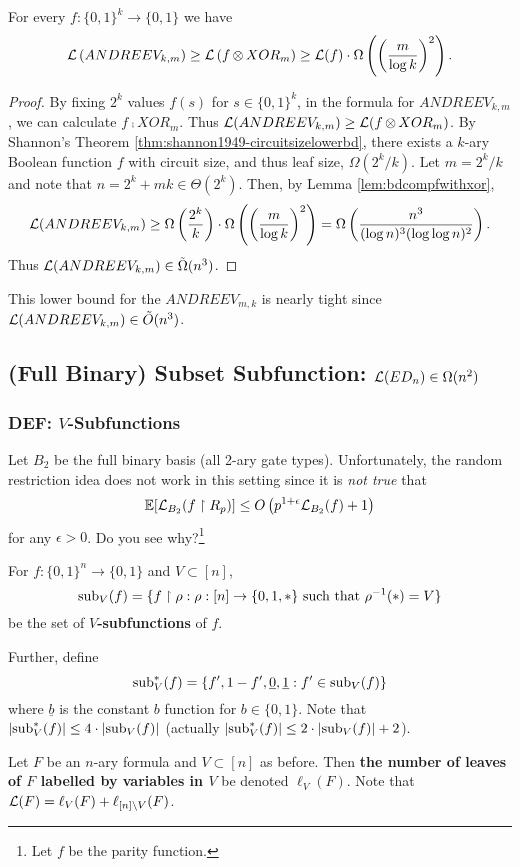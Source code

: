\documentclass[11pt]{article}
\begin{document}
	\begin{theorem}
		\label{thm:L-DmFormulaCubicExplicit-Andreev}
		For every $f: \{0,1\}^k \rightarrow \{0,1\}$ we have
		\[\mathcal{L}\left(ANDREEV_{k,m}\right)\geq \mathcal{L}\left(f\operatorname*{\otimes} XOR_m\right) \geq \mathcal{L}(f)\cdot\Omega\left(\left(\frac{m}{\log k}\right)^2\right).\]
	\end{theorem}
	\begin{proof}
		By fixing $2^k$ values $f(s)$ for $s \in \{0,1\}^k$, in the formula for $ANDREEV_{k,m}$, we can calculate $f \comp XOR_m$. Thus $\mathcal{L}(ANDREEV_{k,m}) \geq \mathcal{L}(f \operatorname*{\otimes} XOR_m)$. By Shannon's Theorem \ref{thm:shannon1949-circuitsizelowerbd}, there exists a $k$-ary Boolean function $f$ with circuit size, and thus leaf size, $\Omega(2^k/k)$. Let $m = 2^k/k$ and note that $n = 2^k + mk \in \Theta(2^k)$. Then, by Lemma \ref{lem:bdcompfwithxor},
		\[\mathcal{L}(ANDREEV_{k,m}) \geq \Omega\left(\frac{2^k}{k}\right) \cdot \Omega\left(\left(\frac{m}{\log k}\right)^2\right) = \Omega\left(\frac{n^3}{(\log n)^3(\log \log n)^2}\right).\]
		Thus $\mathcal{L}(ANDREEV_{k,m}) \in \tilde{\Omega}(n^3)$.
	\end{proof}
	This lower bound for the $ANDREEV_{m,k}$ is nearly tight since $\mathcal{L}(ANDREEV_{k,m}) \in \tilde{O}(n^3)$. 
	
	\subsection{(Full Binary) Subset Subfunction: \texorpdfstring{$\mathcal{L}(ED_n) \in \Omega(n^2)$}{L(EDn) in Omega(n2)}}
	\subsubsection{DEF: \texorpdfstring{$V$}{V}-Subfunctions}
	Let $B_2$ be the full binary basis (all 2-ary gate types). Unfortunately, the random restriction idea does not work in this setting since it is \emph{not true} that
	\[\operatorname{\mathbb{E}}[\mathcal{L}_{B_2}(f \upharpoonright R_p)] \leq O\left(p^{1 + \epsilon}\mathcal{L}_{B_2}(f) + 1\right)\]
	for any $\epsilon > 0$. Do you see why?\footnote{Let $f$ be the parity function.} 
	
	\begin{definition}
		\label{def:NOTE-Vsubfunctions}
		For $f: \{0,1\}^n \rightarrow \{0,1\}$ and $V \subset [n]$, 
		\[\mathrm{sub}_V(f) = \{f\upharpoonright \rho: \rho:[n] \rightarrow \{0,1,*\} \mbox{ such that } \rho^{-1}(*) = V\}\] 
		be the set of \textbf{$V$-subfunctions} of $f$.
		
		Further, define 
		\[\mathrm{sub}_{V}^{*}(f) = \{f', 1 - f', \underline{0}, \underline{1}: f' \in \mathrm{sub}_V(f)\}\] where $\underline{b}$ is the constant $b$ function for $b \in \{0,1\}$. Note that $|\mathrm{sub}_{V}^{*}(f)| \leq 4\cdot|\mathrm{sub}_{V}(f)|$ (actually $|\mathrm{sub}_{V}^{*}(f)| \leq 2\cdot|\mathrm{sub}_{V}(f)| + 2$). 
		
		Let $F$ be an $n$-ary formula and $V \subset [n]$ as before. Then \textbf{the number of leaves of $F$ labelled by variables in $V$} be denoted $\ell_{V}(F)$. Note that $\mathcal{L}(F) = \ell_V(F) + \ell_{[n]\backslash V}(F)$.
	\end{definition}
	
\end{document}
